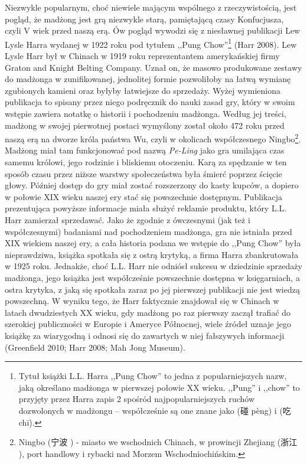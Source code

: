 Niezwykle popularnym, choć niewiele mającym wspólnego z rzeczywistością, jest
pogląd, że madżong jest grą niezwykle starą, pamiętającą czasy Konfucjusza,
czyli V wiek przed naszą erą. Ów pogląd wywodzi się z niesławnej publikacji Lew
Lysle Harra wydanej w 1922 roku pod tytułem ,,Pung Chow''\footnote{Tytuł książki
L.L. Harra ,,Pung Chow'' to jedna z popularniejszych nazw, jaką określano
madżonga w pierwszej połowie XX wieku. ,,Pung'' i ,,chow'' to przyjęty przez
Harra zapis 2 spośród najpopularniejszych ruchów dozwolonych w madżongu --
współcześnie są one znane jako  (碰 pèng) i  (吃 chī).}
(Harr 2008).
Lew Lysle Harr był w Chinach w 1919 roku reprezentantem amerykańskiej firmy
Graton and Knight Belting Company. Uznał on, że masowo produkowane zestawy do
madżonga w zunifikowanej, jednolitej formie pozwoliłoby na łatwą wymianę
zgubionych kamieni oraz byłyby łatwiejsze do sprzedaży.
Wyżej wymieniona publikacja to spisany przez niego podręcznik do nauki zasad
gry, który w swoim wstępie zawiera notatkę o historii i pochodzeniu madżonga.
Według jej treści, madżong w swojej pierwotnej postaci wymyślony został około
472 roku przed naszą erą na dworze króla państwa Wu, czyli w okolicach
współczesnego Ningbo\footnote{Ningbo (宁波 ) - miasto we
wschodnich Chinach, w prowincji Zhejiang (浙江 ), port handlowy i
rybacki nad Morzem Wschodniochińskim.}. Madżong miał tam funkcjonować pod nazwą
\textit{Pe-Ling} jako gra umilająca czas samemu królowi, jego rodzinie i
bliskiemu otoczeniu. Karą za spędzanie w ten sposób czasu przez niższe warstwy
społeczeństwa była śmierć poprzez ścięcie głowy. Później dostęp do gry miał
zostać rozszerzony do kasty kupców, a dopiero w połowie XIX wieku naszej ery
stać się powszechnie dostępnym.
Publikacja prezentująca powyższe informacje miała służyć reklamie produktu,
który L.L. Harr zamierzał sprzedawać. Jako że zgodnie z ówczesnymi (jak
też i współczesnymi) badaniami nad pochodzeniem madżonga, gra nie istniała przed
XIX wiekiem naszej ery, a cała historia podana we wstępie do ,,Pung Chow'' była
nieprawdziwa, książka spotkała się z ostrą krytyką, a firma Harra zbankrutowała
w 1925 roku. Jednakże, choć L.L. Harr nie odniósł sukcesu w dziedzinie sprzedaży
madżonga, jego książka jest współcześnie powszechnie dostępna w księgarniach, a
ostra krytyka, z jaką się spotkała zaraz po jej pierwszej publikacji nie jest
wiedzą powszechną. W wyniku tego, że Harr faktycznie znajdował się w Chinach w
latach dwudziestych XX wieku, gdy madżong po raz pierwszy zaczął trafiać do
szerokiej publiczności w Europie i Ameryce Północnej, wiele źródeł uznaje jego
książkę za wiarygodną i odnosi się do zawartych w niej fałszywych informacji
(Greenfield 2010; Harr 2008; Mah Jong Museum).
